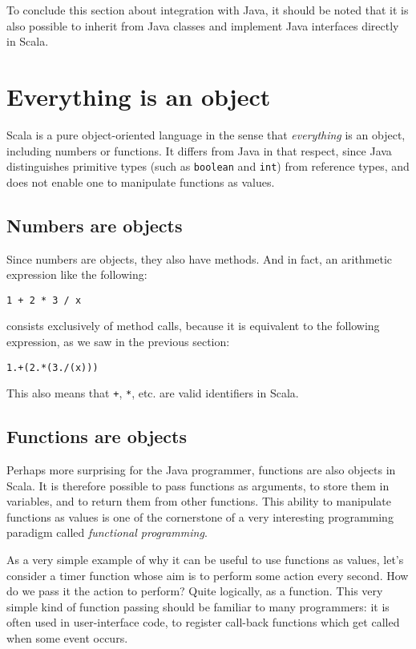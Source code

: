 \documentclass[a4paper,11pt,twoside,titlepage]{article}
\begin{document}
To conclude this section about integration with Java, it should be
noted that it is also possible to inherit from Java classes and
implement Java interfaces directly in Scala.

\section*{Everything is an object}
\label{sec:everything-an-object}

Scala is a pure object-oriented language in the sense that
\emph{everything} is an object, including numbers or functions. It
differs from Java in that respect, since Java distinguishes
primitive types (such as \lstinline?boolean? and \lstinline?int?) from reference
types, and does not enable one to manipulate functions as values.

\subsection*{Numbers are objects}
\label{sec:numbers-are-objects}

Since numbers are objects, they also have methods. And in fact, an
arithmetic expression like the following:
\begin{lstlisting}
1 + 2 * 3 / x
\end{lstlisting}
consists exclusively of method calls, because it is equivalent to the
following expression, as we saw in the previous section:
\begin{lstlisting}
1.+(2.*(3./(x)))
\end{lstlisting}
This also means that \lstinline?+?, \lstinline?*?, etc. are valid identifiers
in Scala.

\subsection*{Functions are objects}
\label{sec:funct-are-objects}

Perhaps more surprising for the Java programmer, functions are also
objects in Scala. It is therefore possible to pass functions as
arguments, to store them in variables, and to return them from other
functions. This ability to manipulate functions as values is one of
the cornerstone of a very interesting programming paradigm called
\emph{functional programming}.

As a very simple example of why it can be useful to use functions as
values, let's consider a timer function whose aim is to perform some
action every second. How do we pass it the action to perform? Quite
logically, as a function. This very simple kind of function passing
should be familiar to many programmers: it is often used in
user-interface code, to register call-back functions which get called
when some event occurs.
\end{document}
